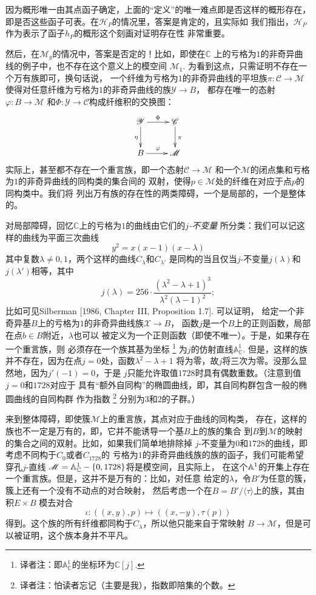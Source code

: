 因为概形唯一由其点函子确定，上面的“定义”的唯一难点即是否这样的概形存在，
即是否这些函子可表。在$\mathscr H_P$的情况里，答案是肯定的，且实际如
我们指出，$\mathscr H_P$作为表示了函子$h_P$的概形这个刻画对证明存在性
非常重要。


然后，在$\mathscr M_g$的情况中，答案是否定的！比如，即使在$\mathbb C$
上的亏格为$1$的非奇异曲线的例子中，也不存在这个意义上的模空间
$\mathscr M_1$. 为看到这点，只需证明不存在一个万有族即可，换句话说，
一个纤维为亏格为$1$的非奇异曲线的平坦族$\pi:\mathscr C\to \mathscr M$
使得对任意纤维为亏格为$1$的非奇异曲线的族$\mathscr Y\to B$，
都存在唯一的态射$\varphi:B\to \mathscr M$
和$\Phi:\mathscr Y\to \mathscr C$构成纤维积的交换图：
\[
    \xymatrix{
        \mathscr Y\ar[r]^\Phi \ar[d]_\eta & \mathscr C\ar[d]^\pi\\
        B \ar[r]^\varphi & \mathscr M
    }
\]
实际上，甚至都不存在一个重言族，即一个态射$\mathscr C\to\mathscr M$
和一个$\mathscr M$的闭点集和亏格为$1$的非奇异曲线的同构类的集合间的
双射，使得$p\in \mathscr M$处的纤维在对应于点$p$的同构类中。我们将
列出万有族的存在性的两类障碍，一个是局部的，一个是整体的。

对局部障碍，回忆$\mathbb C$上的亏格为$1$的曲线由它们的\emph{$j$-不变量}
所分类：我们可以记这样的曲线为平面三次曲线
\[
    y^2=x(x-1)(x-\lambda)
\]
其中复数$\lambda \neq 0,1$，两个这样的曲线$C_\lambda$和$C_{\lambda'}$
是同构的当且仅当$j$-不变量$j(\lambda)$和$j(\lambda')$相等，其中
\[
    j(\lambda)=256\cdot \frac{(\lambda^2-\lambda+1)^3}
    {\lambda^2(\lambda-1)^2};
\]
比如可见Silberman [1986, Chapter III, Proposition 1.7]. 可以证明，
给定一个非奇异基$B$上的亏格为$1$的非奇异曲线族$\mathscr X\to B$，
函数$j$是一个$B$上的正则函数，局部在点$b\in B$附近，$\lambda$也可以
被定义为一个正则函数（即使不唯一）。于是，如果存在一个重言族，则
必须存在一个族其基为坐标%
\footnote{译者注：即$\mathbb A_{\mathbb C}^1$的坐标环为$\mathbb C[j]$.}%
为$j$的仿射直线$\mathbb A_{\mathbb C}^1$.
但是，这样的族并不存在，因为在点$j=0$处，函数$\lambda^2-\lambda+1$
将为零，故$j$将三次为零。没那么显然地，因为$j'(-1)=0$，于是
$j$只能允许取值$1728$时具有偶数重数。（注意到值$j=0$和$1728$对应于
具有“额外自同构”的椭圆曲线，即，其自同构群包含一般的椭圆曲线的自同构群
作为指数%
\footnote{译者注：怕读者忘记（主要是我），指数即陪集的个数。}%
分别为$3$和$2$的子群。）


来到整体障碍，即使簇$\mathscr M$上的重言族，其点对应于曲线的同构类，
存在，这样的族也不一定是万有的，即，它并不能诱导一个基$B$上的族的集合
到$B$到$\mathscr M$的映射的集合之间的双射。比如，如果我们简单地排除掉
$j$-不变量为$0$和$1728$的曲线，即考虑不同构于$C_0$或者$C_{1728}$的
亏格为$1$的非奇异曲线族的族的函子，我们可能希望穿孔$j$-直线
$\mathscr M=\mathbb{A}_{\mathbb C}^1-\{0,1728\}$将是模空间，且实际上，
在这个$\mathbb{A}^1$的开集上存在一个重言族。但是，这并不是万有的：比如，对任意
给定的$\lambda$，令$B'$为任意的簇，簇上还有一个没有不动点的对合映射，
然后考虑一个在$B=B'/\langle \tau\rangle$上的族，其由积$E\times B$
模去对合
\[
    \iota:((x,y),p)\mapsto ((x,-y),\tau(p))
\]
得到。这个族的所有纤维都同构于$C_\lambda$，所以他只能来自于常映射
$B\to \mathscr M$，但是可以被证明，这个族本身并不平凡。

